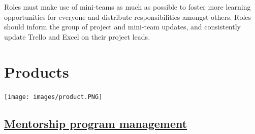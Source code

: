 \documentclass[
]{book}
\begin{document}
Roles must make use of mini-teams as much as possible to foster more learning opportunities for everyone and distribute responsibilities amongst others. Roles should inform the group of project and mini-team updates, and consistently update Trello and Excel on their project leads.

\hypertarget{products}{%
\chapter{Products}\label{products}}

\texttt{[image: images/product.PNG]}

\hypertarget{mentorship-program-management}{%
\section{\texorpdfstring{\href{https://bookdown.org/kulasj/mentoruser/}{Mentorship program management}}{Mentorship program management}}\label{mentorship-program-management}}
\end{document}
